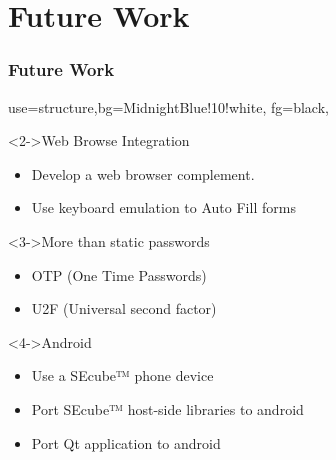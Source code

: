 \documentclass[14pt,usenames,dvipsnames]{beamer}
\begin{document}
\section{Future Work}
\begin{frame}
	\frametitle{Future Work}
	{
	 {use=structure,bg=MidnightBlue!10!white, fg=black,}
  \fontsize{14pt}{14}\selectfont

	
  \vspace{-0.3cm}	
	  
	\begin{block}<2->{Web Browse Integration}
		\begin{itemize}
		  \item Develop a web browser complement.
			\item Use keyboard emulation to Auto Fill forms
		\end{itemize}
	\end{block}

	\vspace{-0.1cm}	

	\begin{block}<3->{More than static passwords}
		\begin{itemize}
			\item OTP (One Time Passwords)
			\item U2F (Universal second factor)
		\end{itemize}
	\end{block}
	
	\vspace{-0.1cm}	
	
	\begin{block}<4->{Android}
		\begin{itemize}
			\item Use a SEcube™ phone device
			\item Port SEcube™ host-side libraries to android
			\item Port Qt application to android
		\end{itemize}
	\end{block}	
	}
	
\end{frame}


\appendix
\end{document}
